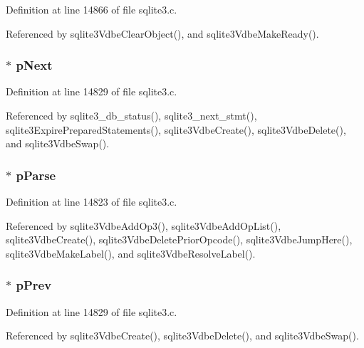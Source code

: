 Definition at line 14866 of file sqlite3.\+c.



Referenced by sqlite3\+Vdbe\+Clear\+Object(), and sqlite3\+Vdbe\+Make\+Ready().

\hypertarget{struct_vdbe_adee0b3608e49fbf227884d272fdcb86e}{}
\subsubsection[{p\+Next}]{ $\ast$ p\+Next}\label{struct_vdbe_adee0b3608e49fbf227884d272fdcb86e}


Definition at line 14829 of file sqlite3.\+c.



Referenced by sqlite3\+\_\+db\+\_\+status(), sqlite3\+\_\+next\+\_\+stmt(), sqlite3\+Expire\+Prepared\+Statements(), sqlite3\+Vdbe\+Create(), sqlite3\+Vdbe\+Delete(), and sqlite3\+Vdbe\+Swap().

\hypertarget{struct_vdbe_ac700bf257b32cd7e491fde90a081379d}{}
\subsubsection[{p\+Parse}]{$\ast$ p\+Parse}\label{struct_vdbe_ac700bf257b32cd7e491fde90a081379d}


Definition at line 14823 of file sqlite3.\+c.



Referenced by sqlite3\+Vdbe\+Add\+Op3(), sqlite3\+Vdbe\+Add\+Op\+List(), sqlite3\+Vdbe\+Create(), sqlite3\+Vdbe\+Delete\+Prior\+Opcode(), sqlite3\+Vdbe\+Jump\+Here(), sqlite3\+Vdbe\+Make\+Label(), and sqlite3\+Vdbe\+Resolve\+Label().

\hypertarget{struct_vdbe_a75fede11b9093f9204a677c0d80fec8c}{}
\subsubsection[{p\+Prev}]{$\ast$ p\+Prev}\label{struct_vdbe_a75fede11b9093f9204a677c0d80fec8c}


Definition at line 14829 of file sqlite3.\+c.



Referenced by sqlite3\+Vdbe\+Create(), sqlite3\+Vdbe\+Delete(), and sqlite3\+Vdbe\+Swap().

